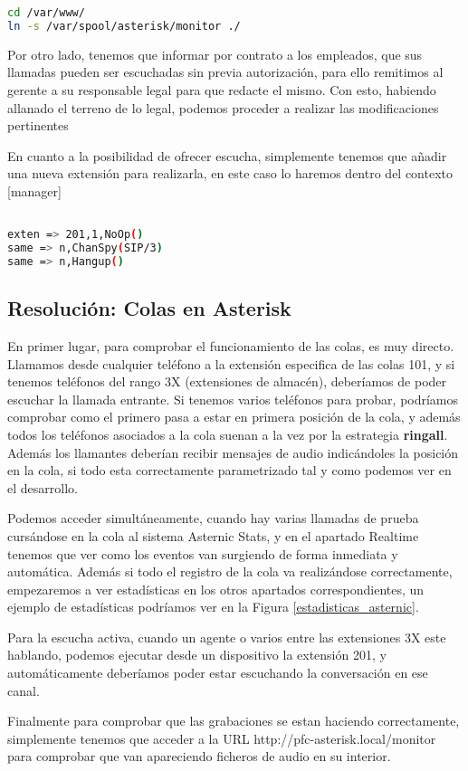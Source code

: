 \begin{lstlisting}[language=sh]
cd /var/www/
ln -s /var/spool/asterisk/monitor ./
\end{lstlisting}

Por otro lado, tenemos que informar por contrato a los empleados, que sus llamadas pueden ser escuchadas sin previa autorización, para ello remitimos al gerente a su responsable legal para que redacte el mismo. Con esto, habiendo allanado el terreno de lo legal, podemos proceder a realizar las modificaciones pertinentes

En cuanto a la posibilidad de ofrecer escucha, simplemente tenemos que añadir una nueva extensión para realizarla, en este caso lo haremos dentro del contexto [manager]

\begin{lstlisting}[language=bash,title={/etc/asterisk/extensions.conf}]

exten => 201,1,NoOp()
same => n,ChanSpy(SIP/3)
same => n,Hangup()

\end{lstlisting}

\subsection{Resolución: Colas en Asterisk}

En primer lugar, para comprobar el funcionamiento de las colas, es muy directo. Llamamos desde cualquier teléfono a la extensión especifica de las colas 101, y si tenemos teléfonos del rango 3X (extensiones de almacén), deberíamos de poder escuchar la llamada entrante. Si tenemos varios teléfonos para probar, podríamos comprobar como el primero pasa a estar en primera posición de la cola, y además todos los teléfonos asociados a la cola suenan a la vez por la estrategia \textbf{ringall}. Además los llamantes deberían recibir mensajes de audio indicándoles la posición en la cola, si todo esta correctamente parametrizado tal y como podemos ver en el desarrollo.

Podemos acceder simultáneamente, cuando hay varias llamadas de prueba cursándose en la cola al sistema Asternic Stats, y en el apartado Realtime tenemos que ver como los eventos van surgiendo de forma inmediata y automática. Además si todo el registro de la cola va realizándose correctamente, empezaremos a ver estadísticas en los otros apartados correspondientes, un ejemplo de estadísticas podríamos ver en la Figura \ref{estadisticas_asternic}.


Para la escucha activa, cuando un agente o varios entre las extensiones 3X este hablando, podemos ejecutar desde un dispositivo la extensión 201, y automáticamente deberíamos poder estar escuchando la conversación en ese canal.

Finalmente para comprobar que las grabaciones se estan haciendo correctamente, simplemente tenemos que acceder a la URL http://pfc-asterisk.local/monitor para comprobar que van apareciendo ficheros de audio en su interior.